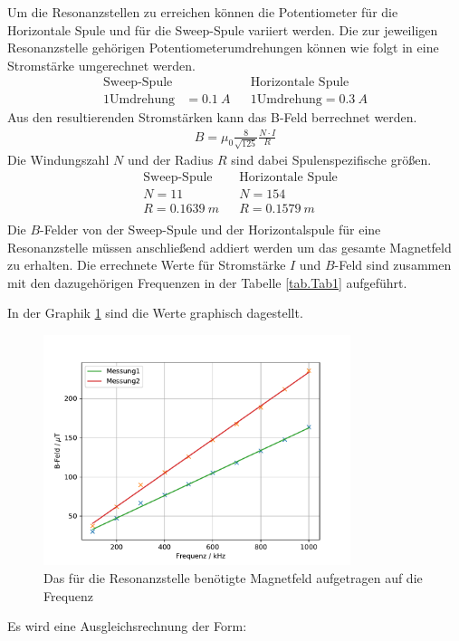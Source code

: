 Um die Resonanzstellen zu erreichen können die Potentiometer für die Horizontale Spule und für die Sweep-Spule variiert werden.
Die zur jeweiligen Resonanzstelle gehörigen Potentiometerumdrehungen können wie folgt in eine Stromstärke umgerechnet werden.
\begin{align*}
  \text{Sweep-Spule}&&&\text{Horizontale Spule}\\
  1 \text{Umdrehung} &= \SI{0,1}{A}&&1 \text{Umdrehung} = \SI{0,3}{A}
\end{align*}
Aus den resultierenden Stromstärken kann das B-Feld berrechnet werden.
\begin{align*}
  B=\mu_0\frac{8}{\sqrt{125}}\frac{N\cdot I}{R}
\end{align*}
Die Windungszahl $N$ und der Radius $R$ sind dabei Spulenspezifische größen.
\begin{align*}
  &\text{Sweep-Spule}&&\text{Horizontale Spule}\\
  &N=11&&N=154\\
  &R=\SI{0.1639}{m}&&R=\SI{0.1579}{m}\\
\end{align*}
Die $B$-Felder von der Sweep-Spule und der Horizontalspule für eine Resonanzstelle müssen anschließend addiert werden um das gesamte Magnetfeld zu erhalten.
Die errechnete Werte für Stromstärke $I$ und $B$-Feld sind zusammen mit den dazugehörigen Frequenzen in der Tabelle \ref{tab.Tab1} aufgeführt.

In der Graphik \ref{fig:Bf} sind die Werte graphisch dagestellt.
\begin{figure}[h!]
  \centering
  \includegraphics[width=0.8\textwidth]{B-Feld.pdf}
  \caption{Das für die Resonanzstelle benötigte Magnetfeld aufgetragen auf die Frequenz}
  \label{fig:Bf}
\end{figure}
Es wird eine Ausgleichsrechnung der Form:
